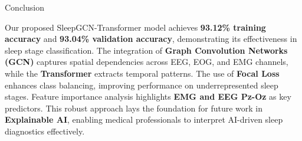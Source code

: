 \begin{frame}{Conclusion}
    \begin{block}{}
    \justifying
    Our proposed SleepGCN-Transformer model achieves \textbf{93.12\% training accuracy} and \textbf{93.04\% validation accuracy}, demonstrating its effectiveness in sleep stage classification. The integration of \textbf{Graph Convolution Networks (GCN)} captures spatial dependencies across EEG, EOG, and EMG channels, while the \textbf{Transformer} extracts temporal patterns. The use of \textbf{Focal Loss} enhances class balancing, improving performance on underrepresented sleep stages. Feature importance analysis highlights \textbf{EMG and EEG Pz-Oz} as key predictors. This robust approach lays the foundation for future work in \textbf{Explainable AI}, enabling medical professionals to interpret AI-driven sleep diagnostics effectively.
    \end{block}
\end{frame}
